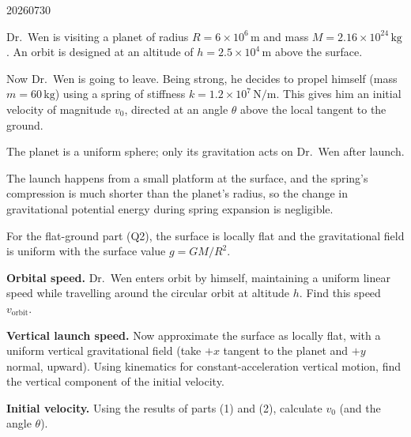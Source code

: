 

\begin{problem}{20260730}

Dr.\ Wen is visiting a planet of radius $R = 6\times10^{6}\,\mathrm{m}$ and mass $M = 2.16\times10^{24}\,\mathrm{kg}$.  An orbit is designed at an altitude of $h = 2.5\times10^{4}\,\mathrm{m}$ above the surface.

Now Dr.\ Wen is going to leave.  Being strong, he decides to propel himself (mass $m = 60\,\mathrm{kg}$) using a spring of stiffness $k = 1.2\times10^{7}\,\mathrm{N/m}$.  This gives him an initial velocity of magnitude $v_0$, directed at an angle $\theta$ above the local tangent to the ground.

\begin{assumptions}
  \item The planet is a uniform sphere; only its gravitation acts on Dr.\ Wen after launch.
  \item The launch happens from a small platform at the surface, and the spring's compression is much shorter than the planet's radius, so the change in gravitational potential energy during spring expansion is negligible.
  \item For the flat-ground part (Q2), the surface is locally flat and the gravitational field is uniform with the surface value $g = GM/R^{2}$.
\end{assumptions}

\begin{questions}
  \item \textbf{Orbital speed.}
        Dr.\ Wen enters orbit by himself, maintaining a uniform linear speed while travelling around the circular orbit at altitude $h$.  Find this speed $v_{\text{orbit}}$.

  \item \textbf{Vertical launch speed.}
        Now approximate the surface as locally flat, with a uniform vertical gravitational field (take $+x$ tangent to the planet and $+y$ normal, upward).  Using kinematics for constant-acceleration vertical motion, find the vertical component of the initial velocity.

  \item \textbf{Initial velocity.}
        Using the results of parts (1) and (2), calculate $v_0$ (and the angle $\theta$).


\end{questions}
\end{problem}
